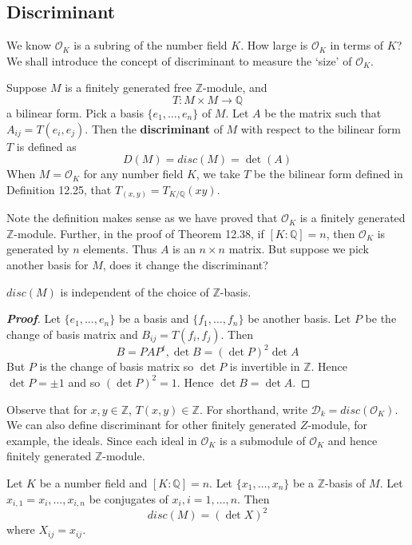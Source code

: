 \subsection{Discriminant}
We know $\mathcal{O}_K$ is a subring of the number field $K$. How large is $\mathcal{O}_K$ in terms of $K$? We shall introduce the concept of discriminant to measure the `size' of $\mathcal{O}_K$.
\begin{definition} Suppose $M$ is a finitely generated free $\mathbb{Z}$-module, and
$$T: M \times M \rightarrow \mathbb{Q}$$
a bilinear form. Pick a basis $\{e_1,\ldots,e_n\}$ of $M$. Let $A$ be the matrix such that $A_{ij}=T(e_i,e_j)$. Then the {\bf discriminant} of $M$ with respect to the bilinear form $T$ is defined as
$$D(M)=disc(M)=\det{(A)}$$
When $M=\mathcal{O}_K$ for any number field $K$, we take $T$ be the bilinear form defined in Definition 12.25, that $T_(x,y)=T_{K/\mathbb{Q}}(xy)$.
\end{definition}
Note the definition makes sense as we have proved that $\mathcal{O}_K$ is a finitely generated $\mathbb{Z}$-module. Further, in the proof of Theorem 12.38, if $[K:\mathbb{Q}]=n$, then $\mathcal{O}_K$ is generated by $n$ elements.
Thus $A$ is an $n \times n$ matrix. But suppose we pick another basis for $M$, does it change the discriminant?
\begin{lemma} $disc(M)$ is independent of the choice of $\mathbb{Z}$-basis.
\end{lemma}
\begin{proof}[\bf Proof] Let $\{e_1,\ldots,e_n\}$ be a basis and $\{f_1,\ldots,f_n\}$ be another basis. Let $P$ be the change of basis matrix and $B_{ij}=T(f_i,f_j)$. Then
$$B=P A P^t, \det{B}=(\det{P})^2 \det{A}$$
But $P$ is the change of basis matrix so $\det{P}$ is invertible in $\mathbb{Z}$. Hence $\det{P}= \pm 1$ and so
$(\det{P})^2=1$. Hence $\det{B}=\det{A}$.
\end{proof}
Observe that for $x,y \in \mathbb{Z}$, $T(x,y) \in \mathbb{Z}$. For shorthand, write $\mathcal{D}_k=disc(\mathcal{O}_K)$. We can also define discriminant for other finitely generated $Z$-module, for example, the ideals. Since each ideal in $\mathcal{O}_K$ is a submodule of $\mathcal{O}_K$ and hence finitely generated $\mathbb{Z}$-module.
\begin{lemma} Let $K$ be a number field and $[K:\mathbb{Q}]=n$. Let $\{x_1,\ldots,x_n\}$ be a $\mathbb{Z}$-basis of $M$. Let $x_{i,1}=x_i,\ldots,x_{i,n}$ be conjugates of $x_i,i=1,\ldots,n$. Then
$$disc(M)=(\det{X})^2$$ where $X_{ij}=x_{ij}$.
\end{lemma}
